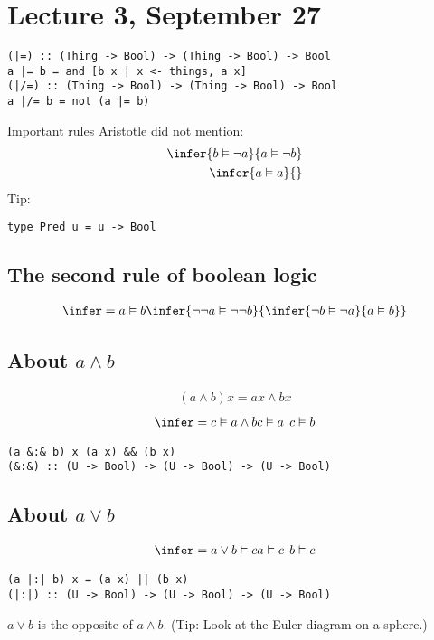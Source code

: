 \documentclass{article}
\begin{document}
\section{Lecture 3, September 27}
\begin{verbatim}
(|=) :: (Thing -> Bool) -> (Thing -> Bool) -> Bool
a |= b = and [b x | x <- things, a x]
(|/=) :: (Thing -> Bool) -> (Thing -> Bool) -> Bool
a |/= b = not (a |= b)
\end{verbatim}
Important rules Aristotle did not mention:
\begin{align}
    \infer{b \vDash \neg a}{a \vDash \neg b}\\
    \infer{a \vDash a}{}
\end{align}
Tip:
\begin{verbatim}
type Pred u = u -> Bool
\end{verbatim}
\subsection{The second rule of boolean logic}
\begin{align}
    \infer={a\vDash b}{
        \infer{\neg\neg a \vDash \neg\neg b}{
            \infer{\neg b \vDash \neg a}{
                a \vDash b
            }
        }
    }
\end{align}
\subsection{About $a\wedge b$}
\begin{align}
    (a\wedge b)x = ax \wedge bx
\end{align}
\begin{align}
    \infer={c\vDash a\wedge b}{c\vDash a \:\: c\vDash b}
\end{align}
\begin{verbatim}
(a &:& b) x (a x) && (b x)
(&:&) :: (U -> Bool) -> (U -> Bool) -> (U -> Bool)
\end{verbatim}
\subsection{About $a\vee b$}
\begin{align}
\infer={a\vee b \vDash c}{a \vDash c \:\: b\vDash c}
\end{align}
\begin{verbatim}
(a |:| b) x = (a x) || (b x)
(|:|) :: (U -> Bool) -> (U -> Bool) -> (U -> Bool)
\end{verbatim}
$a\vee b$ is the opposite of $a\wedge b$. (Tip: Look at the Euler diagram on a sphere.)
\end{document}
